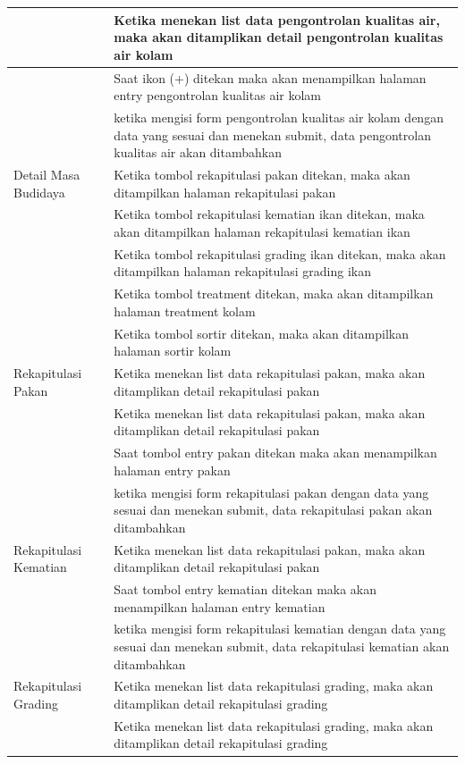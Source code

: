 \begin{enumerate}
\begin{longtable}[c]{@{} |p{4cm}|p{9.3cm}| @{}}
  \hline
   & Ketika menekan list data pengontrolan kualitas air, maka akan ditamplikan detail pengontrolan kualitas air kolam\\
  \hline
   & Saat ikon (+) ditekan maka akan menampilkan halaman entry pengontrolan kualitas air kolam\\
  \hline
   & ketika mengisi form pengontrolan kualitas air kolam dengan data yang sesuai dan menekan submit, data pengontrolan kualitas air akan ditambahkan\\
  \hline
  Detail Masa Budidaya & Ketika tombol rekapitulasi pakan ditekan, maka akan ditampilkan halaman rekapitulasi pakan\\
  \hline
   & Ketika tombol rekapitulasi kematian ikan ditekan, maka akan ditampilkan halaman rekapitulasi kematian ikan\\
  \hline
   & Ketika tombol rekapitulasi grading ikan ditekan, maka akan ditampilkan halaman rekapitulasi grading ikan\\
  \hline
   & Ketika tombol treatment ditekan, maka akan ditampilkan halaman treatment kolam\\
  \hline
   & Ketika tombol sortir ditekan, maka akan ditampilkan halaman sortir kolam\\
  \hline
   Rekapitulasi Pakan & Ketika menekan list data rekapitulasi pakan, maka akan ditamplikan detail rekapitulasi pakan\\
  \hline
   & Ketika menekan list data rekapitulasi pakan, maka akan ditamplikan detail rekapitulasi pakan\\
  \hline
   & Saat tombol entry pakan ditekan maka akan menampilkan halaman entry pakan\\
  \hline
    & ketika mengisi form rekapitulasi pakan dengan data yang sesuai dan menekan submit, data rekapitulasi pakan akan ditambahkan\\
  \hline
   Rekapitulasi Kematian & Ketika menekan list data rekapitulasi pakan, maka akan ditamplikan detail rekapitulasi pakan\\
  \hline
   & Saat tombol entry kematian ditekan maka akan menampilkan halaman entry kematian\\
  \hline
    & ketika mengisi form rekapitulasi kematian dengan data yang sesuai dan menekan submit, data rekapitulasi kematian akan ditambahkan\\
  \hline
   Rekapitulasi Grading & Ketika menekan list data rekapitulasi grading, maka akan ditamplikan detail rekapitulasi grading\\
  \hline
   & Ketika menekan list data rekapitulasi grading, maka akan ditamplikan detail rekapitulasi grading\\

\end{longtable}
\end{enumerate}
